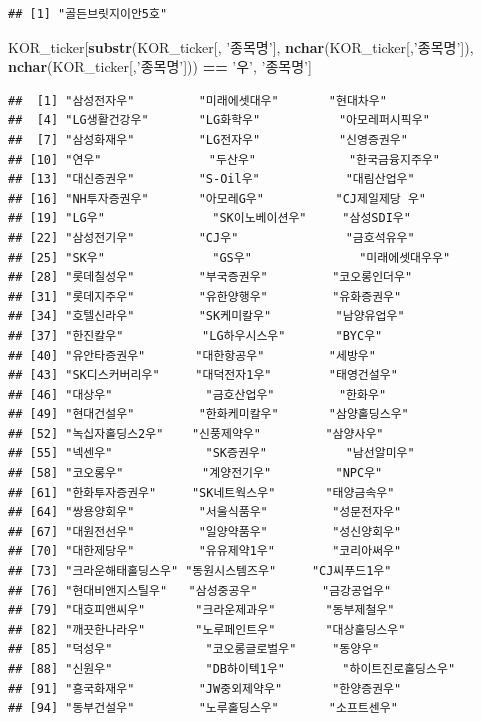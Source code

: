 \documentclass[]{book}
\newenvironment{Shaded}{\begin{snugshade}}{\end{snugshade}}
\newcommand{\KeywordTok}[1]{\textcolor[rgb]{0.13,0.29,0.53}{\textbf{#1}}}
\newcommand{\NormalTok}[1]{#1}
\newcommand{\OperatorTok}[1]{\textcolor[rgb]{0.81,0.36,0.00}{\textbf{#1}}}
\newcommand{\StringTok}[1]{\textcolor[rgb]{0.31,0.60,0.02}{#1}}
\begin{document}
\begin{verbatim}
## [1] "골든브릿지이안5호"
\end{verbatim}

\begin{Shaded}
\begin{Highlighting}[]
\NormalTok{KOR_ticker[}\KeywordTok{substr}\NormalTok{(KOR_ticker[, }\StringTok{'종목명'}\NormalTok{],}
                  \KeywordTok{nchar}\NormalTok{(KOR_ticker[,}\StringTok{'종목명'}\NormalTok{]), }\KeywordTok{nchar}\NormalTok{(KOR_ticker[,}\StringTok{'종목명'}\NormalTok{])) }\OperatorTok{==}\StringTok{ '우'}\NormalTok{, }\StringTok{'종목명'}\NormalTok{]}
\end{Highlighting}
\end{Shaded}

\begin{verbatim}
##  [1] "삼성전자우"         "미래에셋대우"       "현대차우"          
##  [4] "LG생활건강우"       "LG화학우"           "아모레퍼시픽우"    
##  [7] "삼성화재우"         "LG전자우"           "신영증권우"        
## [10] "연우"               "두산우"             "한국금융지주우"    
## [13] "대신증권우"         "S-Oil우"            "대림산업우"        
## [16] "NH투자증권우"       "아모레G우"          "CJ제일제당 우"     
## [19] "LG우"               "SK이노베이션우"     "삼성SDI우"         
## [22] "삼성전기우"         "CJ우"               "금호석유우"        
## [25] "SK우"               "GS우"               "미래에셋대우우"    
## [28] "롯데칠성우"         "부국증권우"         "코오롱인더우"      
## [31] "롯데지주우"         "유한양행우"         "유화증권우"        
## [34] "호텔신라우"         "SK케미칼우"         "남양유업우"        
## [37] "한진칼우"           "LG하우시스우"       "BYC우"             
## [40] "유안타증권우"       "대한항공우"         "세방우"            
## [43] "SK디스커버리우"     "대덕전자1우"        "태영건설우"        
## [46] "대상우"             "금호산업우"         "한화우"            
## [49] "현대건설우"         "한화케미칼우"       "삼양홀딩스우"      
## [52] "녹십자홀딩스2우"    "신풍제약우"         "삼양사우"          
## [55] "넥센우"             "SK증권우"           "남선알미우"        
## [58] "코오롱우"           "계양전기우"         "NPC우"             
## [61] "한화투자증권우"     "SK네트웍스우"       "태양금속우"        
## [64] "쌍용양회우"         "서울식품우"         "성문전자우"        
## [67] "대원전선우"         "일양약품우"         "성신양회우"        
## [70] "대한제당우"         "유유제약1우"        "코리아써우"        
## [73] "크라운해태홀딩스우" "동원시스템즈우"     "CJ씨푸드1우"       
## [76] "현대비앤지스틸우"   "삼성중공우"         "금강공업우"        
## [79] "대호피앤씨우"       "크라운제과우"       "동부제철우"        
## [82] "깨끗한나라우"       "노루페인트우"       "대상홀딩스우"      
## [85] "덕성우"             "코오롱글로벌우"     "동양우"            
## [88] "신원우"             "DB하이텍1우"        "하이트진로홀딩스우"
## [91] "흥국화재우"         "JW중외제약우"       "한양증권우"        
## [94] "동부건설우"         "노루홀딩스우"       "소프트센우"
\end{verbatim}
\end{document}
